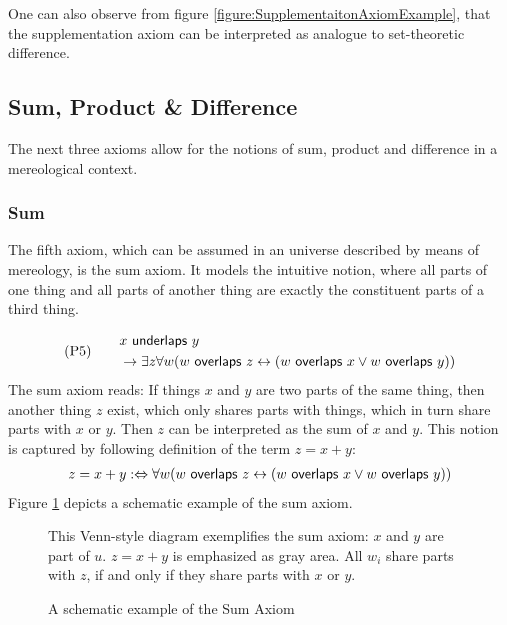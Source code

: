 
One can also observe from figure \ref{figure:SupplementaitonAxiomExample}, that the supplementation axiom can be interpreted as analogue to set-theoretic difference.

\subsection{Sum, Product \& Difference}
\label{subsection:SumProductAndDifference}
The next three axioms allow for the notions of sum, product and difference in a mereological context.

\subsubsection{Sum}
The fifth axiom, which can be assumed in an universe described by means of mereology, is the sum axiom.
It models the intuitive notion, where all parts of one thing and all parts of another thing are exactly the constituent parts of a third thing.

\begin{align}
&\text{(P5)}
\quad
&\begin{split}
&x ~\textsf{underlaps}~ y 
\\&\rightarrow
\exists z \forall w (w ~\textsf{overlaps}~ z \leftrightarrow (w ~\textsf{overlaps}~ x \vee w ~\textsf{overlaps}~ y))
\end{split}
\label{axiom:Sum}
\end{align}
The sum axiom reads:
If things $x$ and $y$ are two parts of the same thing, then another thing $z$ exist, which only shares parts with things, which in turn share parts with $x$ or $y$.
Then $z$ can be interpreted as the sum of $x$ and $y$.
This notion is captured by following definition of the term $z = x + y$:
\begin{align}
z = x + y
:\Leftrightarrow
\forall w (w ~\textsf{overlaps}~ z \leftrightarrow (w ~\textsf{overlaps}~ x \vee w ~\textsf{overlaps}~ y))
\label{definition:Sum}
\end{align}
Figure \ref{figure:SumAxiomExample} depicts a schematic example of the sum axiom.
\begin{figure}[h!]
\begin{center}
\end{center}
{
\scriptsize 
This Venn-style diagram exemplifies the sum axiom:
$x$ and $y$ are part of $u$.
$z = x + y$ is emphasized as gray area.
All $w_i$ share parts with $z$, if and only if they share parts with $x$ or $y$.
}
\caption{A schematic example of the Sum Axiom}
\label{figure:SumAxiomExample}
\end{figure}

